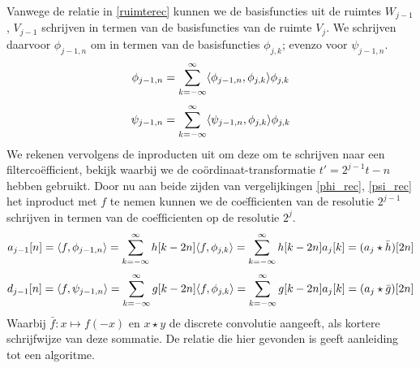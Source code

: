 Vanwege de relatie in \ref{ruimterec} kunnen we de basisfuncties uit de ruimtes $W_{j-1}$,
$V_{j-1}$ schrijven in termen van de basisfuncties van de ruimte $V_j$.
We schrijven daarvoor $\phi_{j-1,n}$ om in termen van de basisfuncties $\phi_{j,k}$; evenzo
voor $\psi_{j-1,n}$.
\begin{equation}
  \label{phi_rec}
  \phi_{j-1,n} = \sum_{k=-\infty}^{\infty} \langle \phi_{j-1,n} , \phi_{j,k} \rangle \phi_{j,k}
\end{equation}
\begin{equation}
  \label{psi_rec}
  \psi_{j-1,n} = \sum_{k=-\infty}^{\infty} \langle \psi_{j-1,n} , \phi_{j,k} \rangle \phi_{j,k}
\end{equation}
We rekenen vervolgens de inproducten uit om deze om te schrijven naar een filterco\"efficient,
bekijk
waarbij we de co\"ordinaat-transformatie $t' = 2^{j-1}t - n$ hebben gebruikt.
Door nu aan beide zijden van vergelijkingen \ref{phi_rec}, \ref{psi_rec} het
inproduct met $f$ te nemen kunnen we de coe\"fficienten van de resolutie $2^{j-1}$ schrijven
in termen van de coe\"fficienten op de resolutie $2^j$.
\begin{equation}
  \label{approx_rec}
  a_{j-1}[n] = \langle f , \phi_{j-1,n} \rangle
  = \sum_{k=-\infty}^{\infty} h[k-2n] \langle f , \phi_{j,k} \rangle
  = \sum_{k=-\infty}^\infty h[k-2n] a_{j}[k]
  = (a_j \star \bar h)[2n]
\end{equation}
\begin{equation}
  \label{detail_rec}
  d_{j-1}[n] = \langle f , \psi_{j-1,n} \rangle
  = \sum_{k=-\infty}^{\infty} g[k-2n] \langle f , \phi_{j,k} \rangle
  = \sum_{k=-\infty}^\infty g[k-2n] a_{j}[k]
  = (a_j \star \bar g)[2n]
\end{equation}
Waarbij $\bar f: x \mapsto f(-x)$ en $x\star y$ de discrete convolutie aangeeft,
als kortere schrijfwijze van deze sommatie.
De relatie die hier gevonden is geeft aanleiding tot een algoritme.

